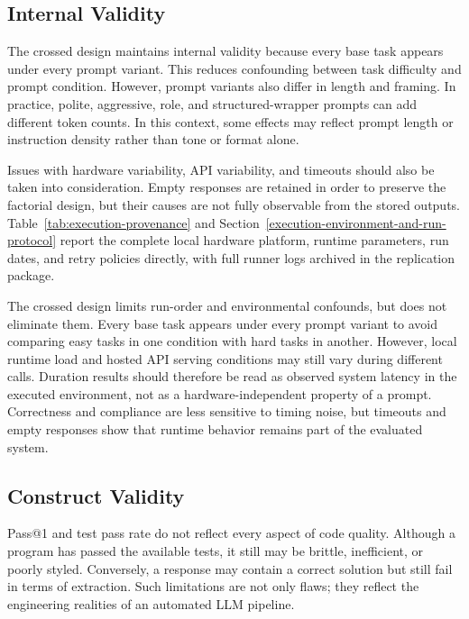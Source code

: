 \documentclass[a4paper,fleqn]{cas-sc}
\begin{document}
\subsection{Internal Validity}\label{internal-validity}

The crossed design maintains internal validity because every base task appears under every prompt variant. This reduces confounding between task difficulty and prompt condition. However, prompt variants also differ in length and framing. In practice, polite, aggressive, role, and structured-wrapper prompts can add different token counts. In this context, some effects may reflect prompt length or instruction density rather than tone or format alone.

Issues with hardware variability, API variability, and timeouts should also be taken into consideration. Empty responses are retained in order to preserve the factorial design, but their causes are not fully observable from the stored outputs. Table~\ref{tab:execution-provenance} and Section~\ref{execution-environment-and-run-protocol} report the complete local hardware platform, runtime parameters, run dates, and retry policies directly, with full runner logs archived in the replication package.

The crossed design limits run-order and environmental confounds, but does not eliminate them. Every base task appears under every prompt variant to avoid comparing easy tasks in one condition with hard tasks in another. However, local runtime load and hosted API serving conditions may still vary during different calls. Duration results should therefore be read as observed system latency in the executed environment, not as a hardware-independent property of a prompt. Correctness and compliance are less sensitive to timing noise, but timeouts and empty responses show that runtime behavior remains part of the evaluated system.

\subsection{Construct Validity}\label{construct-validity}

Pass@1 and test pass rate do not reflect every aspect of code quality. Although a program has passed the available tests, it still may be brittle, inefficient, or poorly styled. Conversely, a response may contain a correct solution but still fail in terms of extraction. Such limitations are not only flaws; they reflect the engineering realities of an automated LLM pipeline.
\end{document}

